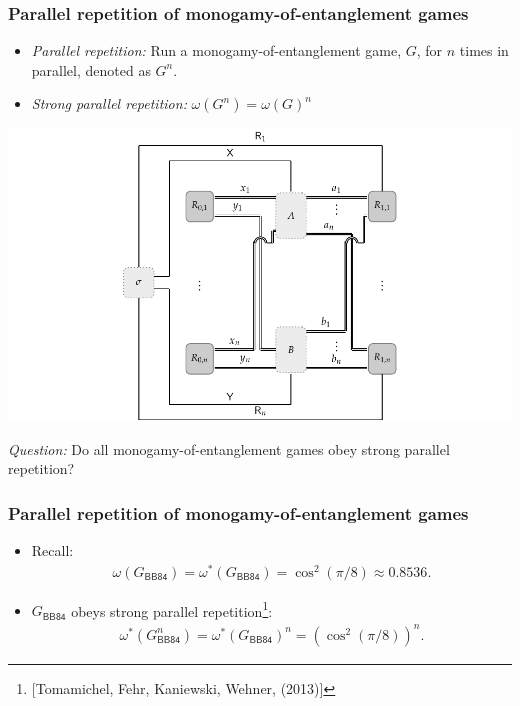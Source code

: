 \documentclass{beamer}
\newcommand{\abs}[1]{\lvert #1 \rvert}
\def\BB84{\mathsf{BB84}}
\begin{document}
  \begin{frame} 
	\frametitle{Parallel repetition of monogamy-of-entanglement games}
	\begin{itemize}
		\item \emph{Parallel repetition:} Run a monogamy-of-entanglement game, $G$, for $n$ times in parallel, denoted as $G^n$. 
		\item \emph{Strong parallel repetition:} $\omega(G^n) = \omega(G)^n$
	\end{itemize}
	\includegraphics[scale=0.6]{figures/extended_nonlocal_game_parallel_repetition_2.pdf}
	\begin{center}
		\emph{Question:} Do all monogamy-of-entanglement games obey strong parallel repetition? 
	\end{center}
\end{frame}

\begin{frame}
	\frametitle{Parallel repetition of monogamy-of-entanglement games}
	\begin{itemize}
		\item Recall: 
		\begin{align*}
			\omega(G_{\BB84}) = \omega^*(G_{\BB84}) = \cos^2(\pi/8) \approx 0.8536.
		\end{align*}
		\item $G_{\BB84}$ obeys strong parallel repetition\footnote{[Tomamichel, Fehr, Kaniewski, Wehner, (2013)]}:
		\begin{equation*}
			\begin{aligned}
				\omega^*(G_{\BB84}^n) = \omega^*(G_{\BB84})^n = \left( \cos^2(\pi/8) \right)^n.
			\end{aligned}
		\end{equation*}
	\end{itemize}
\end{frame}
\end{document}
